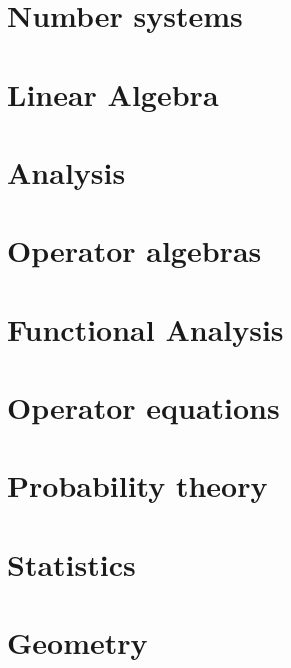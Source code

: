 \documentclass{report}
\begin{document}
\part{Number systems}
\setcounter{chapter}{0} %


\part{Linear Algebra}
\setcounter{chapter}{0} %


\part{Analysis}
\setcounter{chapter}{0} %


\part{Operator algebras}
\setcounter{chapter}{0} %


\part{Functional Analysis}
\setcounter{chapter}{0} %



\part{Operator equations}
\setcounter{chapter}{0} %


\part{Probability theory}
\setcounter{chapter}{0} %


\part{Statistics}
\setcounter{chapter}{0} %


\part{Geometry}
\setcounter{chapter}{0} %

\end{document}

